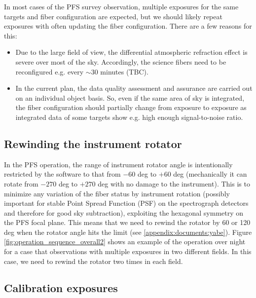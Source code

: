 \documentclass[a4paper]{article}
\begin{document}
In most cases of the PFS survey observation, multiple exposures for
the same targets and fiber configuration are expected, but we should
likely repeat exposures with often updating the fiber configuration.
There are a few reasons for this:

\begin{itemize}
\item Due to the large field of view, the differential atmospheric
  refraction effect is severe over most of the sky. Accordingly, the
  science fibers need to be reconfigured e.g. every $\sim$30 minutes
  (TBC).
\item In the current plan, the data quality assessment and assurance
  are carried out on an individual object basis. So, even if the same
  area of sky is integrated, the fiber configuration should partially
  change from exposure to exposure as integrated data of some targets
  show e.g. high enough signal-to-noise ratio.
\end{itemize}

\subsection{Rewinding the instrument rotator\label{sec:detail_ope_plan:rewind_rotator}}

In the PFS operation, the range of instrument rotator angle is
intentionally restricted by the software to that from $-60$ deg to
$+60$ deg (mechanically it can rotate from $-270$ deg to $+270$ deg
with no damage to the instrument). This is to minimize any variation
of the fiber status by instrument rotation (possibly important for
stable Point Spread Function (PSF) on the spectrograph detectors and
therefore for good sky subtraction), exploiting the hexagonal symmetry
on the PFS focal plane. This means that we need to rewind the rotator
by 60 or 120 deg when the rotator angle hits the limit (see
\ref{appendix:documents:yabe}). Figure
\ref{fig:operation_sequence_overall2} shows an example of the
operation over night for a case that observations with multiple
exposures in two different fields. In this case, we need to rewind the
rotator two times in each field.

\subsection{Calibration exposures\label{sec:detail_ope_plan:calibration}}
\end{document}
